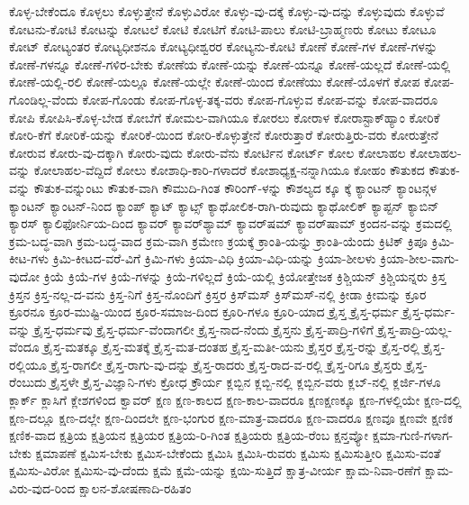 {ಕೊಳ್ಳ-ಬೇಕೆಂದೂ
ಕೊಳ್ಳಲು
ಕೊಳ್ಳುತ್ತೇನೆ
ಕೊಳ್ಳುವಿರೋ
ಕೊಳ್ಳು-ವು-ದಕ್ಕೆ
ಕೊಳ್ಳು-ವು-ದನ್ನು
ಕೊಳ್ಳುವುದು
ಕೊಳ್ಳುವೆ
ಕೋಟನು-ಕೋಟಿ
ಕೋಟನ್ನು
ಕೋಟಲೆ
ಕೋಟಿ
ಕೋಟಿಗೆ
ಕೋಟಿ-ಪಾಲು
ಕೋಟಿ-ಬ್ರಾಹ್ಮಣರು
ಕೋಟು
ಕೋಟೂ
ಕೋಟ್
ಕೋಟ್ಯಂತರ
ಕೋಟ್ಯಧೀಶನೂ
ಕೋಟ್ಯಧೀಶ್ವರರ
ಕೋಟ್ಯನು-ಕೋಟಿ
ಕೋಣೆ
ಕೋಣೆ-ಗಳ
ಕೋಣೆ-ಗಳನ್ನು
ಕೋಣೆ-ಗಳನ್ನೂ
ಕೋಣೆ-ಗಳಿರ-ಬೇಕು
ಕೋಣೆಯ
ಕೋಣೆ-ಯನ್ನು
ಕೋಣೆ-ಯನ್ನೂ
ಕೋಣೆ-ಯಲ್ಲದೆ
ಕೋಣೆ-ಯಲ್ಲಿ
ಕೋಣೆ-ಯಲ್ಲಿ-ರಲಿ
ಕೋಣೆ-ಯಲ್ಲೂ
ಕೋಣೆ-ಯಲ್ಲೇ
ಕೋಣೆ-ಯಿಂದ
ಕೋಣೆಯು
ಕೋಣೆ-ಯೊಳಗೆ
ಕೋಪ
ಕೋಪ-ಗೊಂಡಿಲ್ಲ-ವೆಂದು
ಕೋಪ-ಗೊಂಡು
ಕೋಪ-ಗೊಳ್ಳ-ತಕ್ಕ-ವರು
ಕೋಪ-ಗೊಳ್ಳುವ
ಕೋಪ-ವನ್ನು
ಕೋಪ-ವಾದರೂ
ಕೋಪಿ
ಕೋಪಿಸಿ-ಕೊಳ್ಳ-ಬೇಡ
ಕೋಬೆಗೆ
ಕೋಮಲ-ವಾಗಿಯೂ
ಕೋರಲು
ಕೋರಾಳ
ಕೋರಾಸ್ಟಾಕ್‌ಹ್ಯಾಂ
ಕೋರಿಕೆ
ಕೋರಿ-ಕೆಗೆ
ಕೋರಿಕೆ-ಯನ್ನು
ಕೋರಿಕೆ-ಯಿಂದ
ಕೋರಿ-ಕೊಳ್ಳುತ್ತೇನೆ
ಕೋರುತ್ತಾರೆ
ಕೋರುತ್ತಿರು-ವರು
ಕೋರುತ್ತೇನೆ
ಕೋರುವ
ಕೋರು-ವು-ದಕ್ಕಾಗಿ
ಕೋರು-ವುದು
ಕೋರು-ವೆನು
ಕೋರ್ಟಿನ
ಕೋರ್ಟ್
ಕೋಲ
ಕೋಲಾಹಲ
ಕೋಲಾಹಲ-ವನ್ನು
ಕೋಲಾಹಲ-ವೆದ್ದಿದೆ
ಕೋಲು
ಕೋಶಾಧಿ-ಕಾರಿ-ಗಳಾದರೆ
ಕೋಶಾಧ್ಯಕ್ಷ-ನನ್ನಾಗಿಯೂ
ಕೋಹಂ
ಕೌತುಕದ
ಕೌತುಕ-ವನ್ನು
ಕೌತುಕ-ವನ್ನುಂಟು
ಕೌತುಕ-ವಾಗಿ
ಕೌಮುದಿ-ಗಿಂತ
ಕೌರಿಂಗ್‌-ಳನ್ನು
ಕೌಶಲ್ಯದ
ಕ್ಕೂ
ಕ್ಕೆ
ಕ್ಯಾಂಟನ್
ಕ್ಯಾಂಟನ್ಗಳ
ಕ್ಯಾಂಟನ್‌
ಕ್ಯಾಂಟನ್‌-ನಿಂದ
ಕ್ಯಾಂಪ್
ಕ್ಯಾಟ್
ಕ್ಯಾಟ್ಸ್
ಕ್ಯಾಥೋಲಿಕ-ರಾಗಿ-ರುವುದು
ಕ್ಯಾಥೋಲಿಕ್
ಕ್ಯಾಪ್ಟನ್
ಕ್ಯಾಬಿನ್
ಕ್ಯಾರಸ್
ಕ್ಯಾಲಿಫೋರ್ನಿಯ-ದಿಂದ
ಕ್ಯಾವರ್
ಕ್ಯಾವರ್‌ಶ್ಯಾಮ್
ಕ್ಯಾವರ್‌ಷಮ್
ಕ್ಯಾವರ್‌ಷಾಮ್
ಕ್ರಂದನ-ವನ್ನು
ಕ್ರಮದಲ್ಲಿ
ಕ್ರಮ-ಬದ್ಧ-ವಾಗಿ
ಕ್ರಮ-ಬದ್ಧ-ವಾದ
ಕ್ರಮ-ವಾಗಿ
ಕ್ರಮೇಣ
ಕ್ರಯಕ್ಕೆ
ಕ್ರಾಂತಿ-ಯನ್ನು
ಕ್ರಾಂತಿ-ಯೆಂದು
ಕ್ರಿಟಿಕ್
ಕ್ರಿಪೂ
ಕ್ರಿಮಿ-ಕೀಟ-ಗಳು
ಕ್ರಿಮಿ-ಕೀಟದ-ವರೆ-ವಿಗೆ
ಕ್ರಿಮಿ-ಗಳು
ಕ್ರಿಯಾ-ವಿಧಿ
ಕ್ರಿಯಾ-ವಿಧಿ-ಯನ್ನು
ಕ್ರಿಯಾ-ಶೀಲಳು
ಕ್ರಿಯಾ-ಶೀಲ-ವಾಗು-ವುದೋ
ಕ್ರಿಯೆ
ಕ್ರಿಯೆ-ಗಳ
ಕ್ರಿಯೆ-ಗಳನ್ನು
ಕ್ರಿಯೆ-ಗಳಿಲ್ಲದೆ
ಕ್ರಿಯೆ-ಯಲ್ಲಿ
ಕ್ರಿಯೋತ್ತೇಜಕ
ಕ್ರಿಶ್ಚಿಯನ್
ಕ್ರಿಶ್ಚಿಯನ್ನರು
ಕ್ರಿಸ್ತ
ಕ್ರಿಸ್ತನ
ಕ್ರಿಸ್ತ-ನಲ್ಲ-ದ-ವನು
ಕ್ರಿಸ್ತ-ನಿಗೆ
ಕ್ರಿಸ್ತ-ನೊಂದಿಗೆ
ಕ್ರಿಸ್ತರ
ಕ್ರಿಸ್‌ಮಸ್
ಕ್ರಿಸ್‌ಮಸ್‌-ನಲ್ಲಿ
ಕ್ರೀಡಾ
ಕ್ರೀಮನ್ನು
ಕ್ರೂರ
ಕ್ರೂರನೂ
ಕ್ರೂರ-ಮುಷ್ಟಿ-ಯಿಂದ
ಕ್ರೂರ-ಸಮಾಜ-ದಿಂದ
ಕ್ರೂರಿ-ಗಳೂ
ಕ್ರೂರಿ-ಯಾದ
ಕ್ರೈಸ್ತ
ಕ್ರೈಸ್ತ-ಧರ್ಮ
ಕ್ರೈಸ್ತ-ಧರ್ಮ-ವನ್ನು
ಕ್ರೈಸ್ತ-ಧರ್ಮವು
ಕ್ರೈಸ್ತ-ಧರ್ಮ-ವೆಂದಾಗಲೀ
ಕ್ರೈಸ್ತ-ನಾದ-ನೆಂದು
ಕ್ರೈಸ್ತನು
ಕ್ರೈಸ್ತ-ಪಾದ್ರಿ-ಗಳಿಗೆ
ಕ್ರೈಸ್ತ-ಪಾದ್ರಿ-ಯಲ್ಲ-ವೆಂದೂ
ಕ್ರೈಸ್ತ-ಮತಕ್ಕೂ
ಕ್ರೈಸ್ತ-ಮತಕ್ಕೆ
ಕ್ರೈಸ್ತ-ಮತ-ದಂತಹ
ಕ್ರೈಸ್ತ-ಮತೀ-ಯನು
ಕ್ರೈಸ್ತರ
ಕ್ರೈಸ್ತ-ರನ್ನು
ಕ್ರೈಸ್ತ-ರಲ್ಲಿ
ಕ್ರೈಸ್ತ-ರಲ್ಲಿಯೂ
ಕ್ರೈಸ್ತ-ರಾಗಲೀ
ಕ್ರೈಸ್ತ-ರಾಗು-ವು-ದನ್ನು
ಕ್ರೈಸ್ತ-ರಾದರು
ಕ್ರೈಸ್ತ-ರಾದ-ವ-ರಲ್ಲಿ
ಕ್ರೈಸ್ತ-ರಿಗೂ
ಕ್ರೈಸ್ತರು
ಕ್ರೈಸ್ತ-ರೆಂಬುದು
ಕ್ರೈಸ್ತಳೇ
ಕ್ರೈಸ್ತ-ವಿಜ್ಞಾನಿ-ಗಳು
ಕ್ರೋಧ
ಕ್ರೌರ್ಯ
ಕ್ಲಬ್ಬಿನ
ಕ್ಲಬ್ಬಿ-ನಲ್ಲಿ
ಕ್ಲಬ್ಬಿನ-ವರು
ಕ್ಲಬ್‌-ನಲ್ಲಿ
ಕ್ಲರ್ಜಿ-ಗಳೂ
ಕ್ಲಾರ್ಕ್
ಕ್ಲಾಸಿಗೆ
ಕ್ಲೇಶಗಳಿಂದ
ಕ್ವಾವರ್
ಕ್ಷಣ
ಕ್ಷಣ-ಕಾಲದ
ಕ್ಷಣ-ಕಾಲ-ವಾದರೂ
ಕ್ಷಣಕ್ಷಣಕ್ಕೂ
ಕ್ಷಣ-ಗಳಲ್ಲಿಯೇ
ಕ್ಷಣ-ದಲ್ಲಿ
ಕ್ಷಣ-ದಲ್ಲೂ
ಕ್ಷಣ-ದಲ್ಲೇ
ಕ್ಷಣ-ದಿಂದಲೇ
ಕ್ಷಣ-ಭಂಗುರ
ಕ್ಷಣ-ಮಾತ್ರ-ವಾದರೂ
ಕ್ಷಣ-ವಾದರೂ
ಕ್ಷಣವೂ
ಕ್ಷಣವೇ
ಕ್ಷಣಿಕ
ಕ್ಷಣಿಕ-ವಾದ
ಕ್ಷತ್ರಿಯ
ಕ್ಷತ್ರಿಯನ
ಕ್ಷತ್ರಿಯರ
ಕ್ಷತ್ರಿಯ-ರಿ-ಗಿಂತ
ಕ್ಷತ್ರಿಯರು
ಕ್ಷತ್ರಿಯ-ರೆಂಬ
ಕ್ಷನ್ತವ್ಯೋ
ಕ್ಷಮಾ-ಗುಣಿ-ಗಳಾಗ-ಬೇಕು
ಕ್ಷಮಾಪಣೆ
ಕ್ಷಮಿಸ-ಬೇಕು
ಕ್ಷಮಿಸ-ಬೇಕೆಂದು
ಕ್ಷಮಿಸಿ
ಕ್ಷಮಿಸಿ-ರುವರು
ಕ್ಷಮಿಸು
ಕ್ಷಮಿಸುತ್ತೀರಿ
ಕ್ಷಮಿಸು-ವಂತೆ
ಕ್ಷಮಿಸು-ವಿರೋ
ಕ್ಷಮಿಸು-ವು-ದೆಂದು
ಕ್ಷಮೆ
ಕ್ಷಮೆ-ಯನ್ನು
ಕ್ಷಯಿ-ಸುತ್ತಿದೆ
ಕ್ಷಾತ್ರ-ವೀರ್ಯ
ಕ್ಷಾಮ-ನಿವಾ-ರಣೆಗೆ
ಕ್ಷಾಮ-ವಿರು-ವುದ-ರಿಂದ
ಕ್ಷಾಲನ-ಶೋಷಣಾದಿ-ರಹಿತಂ
}
